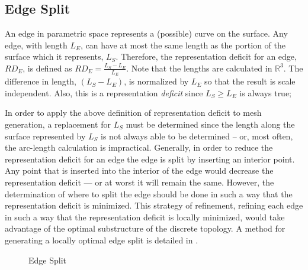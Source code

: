 \subsection{Edge Split}
An edge in parametric space represents a (possible) curve on the
surface. Any edge, with length $L_E$, can have at most the same length
as the portion of the surface which it represents, $L_S$. Therefore, the
representation deficit for an edge, $RD_E$, is defined as $RD_E =
\frac{L_S - L_E}{L_E}$. Note that the lengths are calculated in
${\mathbb R}^3$. The difference in length, $\left(L_S - L_E\right)$, is
normalized by $L_E$ so that the result is scale independent. Also, this
is a representation {\it deficit} since $L_S \ge L_E$ is always true;

In order to apply the above definition of representation deficit to mesh
generation, a replacement for $L_S$ must be determined since the length
along the surface represented by $L_S$ is not always able to be
determined -- or, most often, the arc-length calculation is impractical.
Generally, in order to reduce the representation deficit for an edge the
edge is split by inserting an interior point. Any point that is inserted
into the interior of the edge would decrease the representation deficit
--- or at worst it will remain the same. However, the determination of
where to split the edge should be done in such a way that the
representation deficit is minimized. This strategy of refinement,
refining each edge in such a way that the representation deficit is
locally minimized, would take advantage of the optimal substructure of
the discrete topology. A method for generating a locally optimal edge
split is detailed in \cite{mclaurin12,mclaurin13}.

\begin{figure}[h!]
  \caption{Edge Split}
\end{figure}

